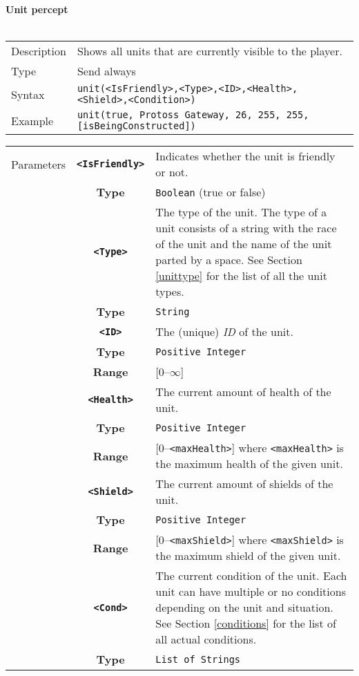 \newpage
\noindent
\textbf{Unit percept}\\
\\
\begin{tabularx}{\textwidth}{lX}
 Description & Shows all units that are currently visible to the player. \\
 Type & Send always \\
 Syntax & \verb|unit(<IsFriendly>,<Type>,<ID>,<Health>,<Shield>,<Condition>)| \\
 Example & \verb|unit(true, Protoss Gateway, 26, 255, 255, [isBeingConstructed])| \\ 
 \end{tabularx}
 \begin{tabularx}{\textwidth}{l | c | p{8cm}|}
 \cline{2-3} 
 Parameters & \textbf{\verb|<IsFriendly>|} & Indicates whether the unit is friendly or not. \\
            & \textbf{Type} & \verb|Boolean| (true or false) \\
            \cline{2-3} 
            & \textbf{\verb|<Type>|} & The type of the unit. The type of a unit consists of a string with the race of the unit and the name of the unit parted by a space. See Section \ref{unittype} for the list of all the unit types. \\
            & \textbf{Type} & \verb|String| \\
            \cline{2-3} 
            & \textbf{\verb|<ID>|} & The (unique) \textit{ID} of the unit.\\
            & \textbf{Type} & \verb|Positive Integer| \\
            & \textbf{Range} & [0--$\infty$] \\
            \cline{2-3} 
            & \textbf{\verb|<Health>|} & The current amount of health of the unit.\\
            & \textbf{Type} & \verb|Positive Integer| \\
            & \textbf{Range} & [0--\verb|<maxHealth>|] where \verb|<maxHealth>| is the maximum health of the given unit.\\
            \cline{2-3} 
            & \textbf{\verb|<Shield>|} & The current amount of shields of the unit. \\
            & \textbf{Type} & \verb|Positive Integer| \\
            & \textbf{Range} & [0--\verb|<maxShield>|] where \verb|<maxShield>| is the maximum shield of the given unit. \\
            \cline{2-3} 
            & \textbf{\verb|<Cond>|} & The current condition of the unit. Each unit can have multiple or no conditions depending on the unit and situation. See Section \ref{conditions} for the list of all actual conditions.\\ 
            & \textbf{Type} & \verb|List of Strings| \\
            \cline{2-3} 
\end{tabularx}\\

